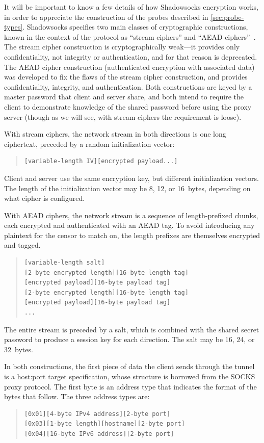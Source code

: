 \documentclass[sigconf,letterpaper]{acmart}
\begin{document}
It will be important to know a few details of how Shadowsocks encryption works,
in order to appreciate the construction of the probes described in \autoref{sec:probe-types}.
Shadowsocks specifies two main classes
of cryptographic constructions, known in the context of the protocol as
``stream ciphers'' and ``AEAD ciphers''~\cite{spec-shadowsocks}.
The stream cipher construction is cryptographically weak---it
provides only confidentiality, not integrity or authentication,
and for that reason is deprecated.
The AEAD cipher construction (authenticated encryption with associated data)
was developed to fix the flaws of the stream cipher construction,
and provides confidentiality, integrity, and authentication.
Both constructions are keyed by a master password that client and server share,
and both intend to require the client to demonstrate knowledge
of the shared password before using the proxy server
(though as we will see, with stream ciphers the requirement is loose).

With stream ciphers,
the network stream
in both directions is one long ciphertext, preceded by a random initialization vector:
\begin{quote}
\begin{verbatim}
[variable-length IV][encrypted payload...]
\end{verbatim}
\end{quote}
Client and server use the same encryption key,
but different initialization vectors.
The length of the initialization vector may be 8, 12, or 16~bytes,
depending on what cipher is configured.

With AEAD ciphers,
the network stream is a sequence of
length-prefixed chunks, each encrypted and authenticated with an AEAD tag.
To avoid introducing any plaintext for the censor to match on,
the length prefixes are themselves encrypted and tagged.
\begin{quote}
\begin{verbatim}
[variable-length salt]
[2-byte encrypted length][16-byte length tag]
[encrypted payload][16-byte payload tag]
[2-byte encrypted length][16-byte length tag]
[encrypted payload][16-byte payload tag]
...
\end{verbatim}
\end{quote}
The entire stream is preceded by a salt,
which is combined with the shared secret password
to produce a session key for each direction.
The salt may be 16, 24, or 32~bytes.

In both constructions,
the first piece of data the client sends through the tunnel
is a host:port target specification,
whose structure is borrowed from the SOCKS proxy protocol.
The first byte is an address type that indicates the format of the bytes that follow.
The three address types are:
\begin{quote}
\begin{verbatim}
[0x01][4-byte IPv4 address][2-byte port]
[0x03][1-byte length][hostname][2-byte port]
[0x04][16-byte IPv6 address][2-byte port]
\end{verbatim}
\end{quote}
\end{document}
